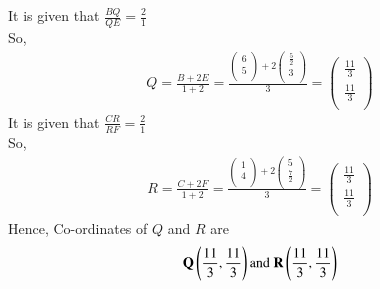 \documentclass[journal]{IEEEtran}
\numberwithin{equation}{enumi}
\numberwithin{figure}{enumi}
\begin{document}
It is given that $\frac{BQ}{QE}=\frac{2}{1}$\\
So,\\
\begin{align*}
    Q=\frac{B+2E}{1+2}=\frac{\begin{pmatrix}6\\5\\ \end{pmatrix} + 2\begin{pmatrix}\frac{5}{2}\\3\\ \end{pmatrix}}{3}=\begin{pmatrix}\frac{11}{3}\\ \frac{11}{3}\\ \end{pmatrix}
\end{align*}
It is given that $\frac{CR}{RF}=\frac{2}{1}$\\
So,\\
\begin{align*}
    R=\frac{C+2F}{1+2}=\frac{\begin{pmatrix}1\\4\\ \end{pmatrix} + 2\begin{pmatrix}5\\\frac{7}{2}\\ \end{pmatrix}}{3}=\begin{pmatrix}\frac{11}{3}\\ \frac{11}{3}\\ \end{pmatrix}
\end{align*}
Hence, Co-ordinates of $Q$ and $R$ are\\
\begin{align*}
    \vec{Q}\brak{\frac{11}{3},\frac{11}{3}} \text{and}\ \vec{R}\brak{\frac{11}{3},\frac{11}{3}}
\end{align*}
\end{document}
